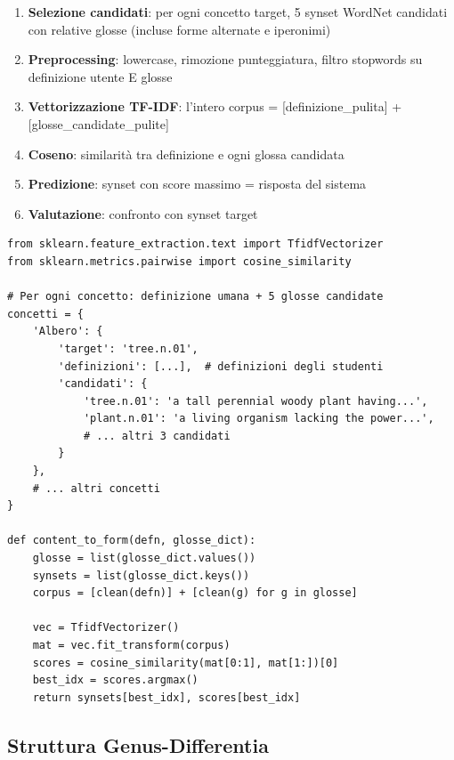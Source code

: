 \documentclass[12pt,a4paper]{article}
\begin{document}
\begin{enumerate}
  \item \textbf{Selezione candidati}: per ogni concetto target, 5 synset WordNet candidati con relative glosse (incluse forme alternate e iperonimi)
  \item \textbf{Preprocessing}: lowercase, rimozione punteggiatura, filtro stopwords su definizione utente E glosse
  \item \textbf{Vettorizzazione TF-IDF}: l'intero corpus = [definizione\_pulita] + [glosse\_candidate\_pulite]
  \item \textbf{Coseno}: similarit\`a tra definizione e ogni glossa candidata
  \item \textbf{Predizione}: synset con score massimo = risposta del sistema
  \item \textbf{Valutazione}: confronto con synset target
\end{enumerate}

\begin{codebox}
\begin{lstlisting}[style=python]
from sklearn.feature_extraction.text import TfidfVectorizer
from sklearn.metrics.pairwise import cosine_similarity

# Per ogni concetto: definizione umana + 5 glosse candidate
concetti = {
    'Albero': {
        'target': 'tree.n.01',
        'definizioni': [...],  # definizioni degli studenti
        'candidati': {
            'tree.n.01': 'a tall perennial woody plant having...',
            'plant.n.01': 'a living organism lacking the power...',
            # ... altri 3 candidati
        }
    },
    # ... altri concetti
}

def content_to_form(defn, glosse_dict):
    glosse = list(glosse_dict.values())
    synsets = list(glosse_dict.keys())
    corpus = [clean(defn)] + [clean(g) for g in glosse]

    vec = TfidfVectorizer()
    mat = vec.fit_transform(corpus)
    scores = cosine_similarity(mat[0:1], mat[1:])[0]
    best_idx = scores.argmax()
    return synsets[best_idx], scores[best_idx]
\end{lstlisting}
\end{codebox}

\subsection{Struttura Genus-Differentia}
\end{document}

